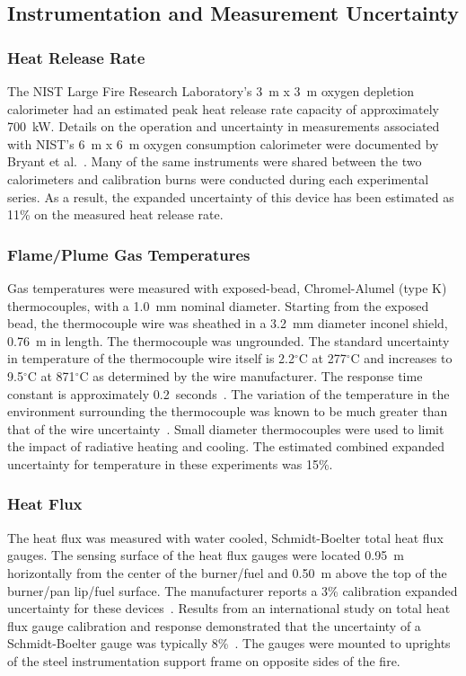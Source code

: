 \documentclass[twoside]{uocthesis}
\begin{document}
{\subsection{Instrumentation and Measurement Uncertainty}

\subsubsection{Heat Release Rate}

The NIST Large Fire Research Laboratory's 3~m x 3~m oxygen depletion calorimeter had an estimated peak heat release rate capacity of approximately 700~kW.  Details on the operation and uncertainty in measurements associated with NIST's 6~m x 6~m oxygen consumption calorimeter were documented by Bryant et al.~\cite{Bryant:2004}. Many of the same instruments were shared between the two calorimeters and calibration burns were conducted during each experimental series.  As a result, the expanded uncertainty of this device has been estimated as 11\% on the measured heat release rate.

\subsubsection{Flame/Plume Gas Temperatures}

Gas temperatures were measured with exposed-bead, Chromel-Alumel (type K) thermocouples, with a 1.0~mm nominal diameter.  Starting from the exposed bead, the thermocouple wire was sheathed in a 3.2~mm diameter inconel shield, 0.76~m in length. The thermocouple was ungrounded. The standard uncertainty in temperature of the thermocouple wire itself is 2.2$^\circ$C at 277$^\circ$C and increases to 9.5$^\circ$C at 871$^\circ$C as determined by the wire manufacturer.  The response time constant is approximately 0.2~seconds~\cite{Omega}.  The variation of the temperature in the environment surrounding the thermocouple was known to be much greater than that of the wire uncertainty~\cite{Blevins:1999,Pitts:2001}. Small diameter thermocouples were used to limit the impact of radiative heating and cooling.  The estimated combined expanded uncertainty for temperature in these experiments was 15\%.

\subsubsection{Heat Flux}

The heat flux was measured with water cooled, Schmidt-Boelter total heat flux gauges. The sensing surface of the heat flux gauges were located 0.95~m horizontally from the center of the burner/fuel and 0.50~m above the top of the burner/pan lip/fuel surface.  The manufacturer reports a 3\% calibration expanded uncertainty for these devices~\cite{Medtherm}. Results from an international study on total heat flux gauge calibration and response demonstrated that the uncertainty of a Schmidt-Boelter gauge was typically 8\%~\cite{Pitts:2006}.  The gauges were mounted to uprights of the steel instrumentation support frame on opposite sides of the fire.

}
\end{document}
